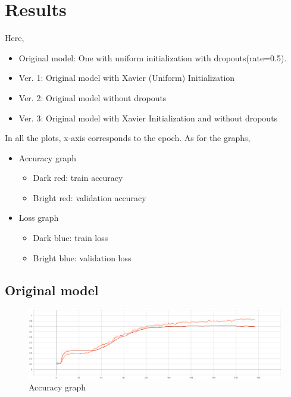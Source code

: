 \chapter{Results}
Here,
\begin{itemize}
\item Original model: One with uniform initialization with dropouts(rate=0.5).

\item Ver. 1: Original model with Xavier (Uniform) Initialization

\item Ver. 2: Original model without dropouts

\item Ver. 3: Original model with Xavier Initialization and without dropouts
\end{itemize}

In all the plots, x-axis corresponds to the epoch.
As for the graphs,

\begin{itemize}
\item Accuracy graph
	\begin{itemize}
	\item Dark red: train accuracy
	\item Bright red: validation accuracy
	\end{itemize}

\item Loss graph
	\begin{itemize}
	\item Dark blue: train loss
	\item Bright blue: validation loss
	\end{itemize}
\end{itemize}

\newpage
\section{Original model}

\begin{figure}[htbp]
\centering
\includegraphics[width=0.7\linewidth]{results/fig/Accuracy0.png}
\caption{Accuracy graph}
\label{fig:accuracy0}
\end{figure}

